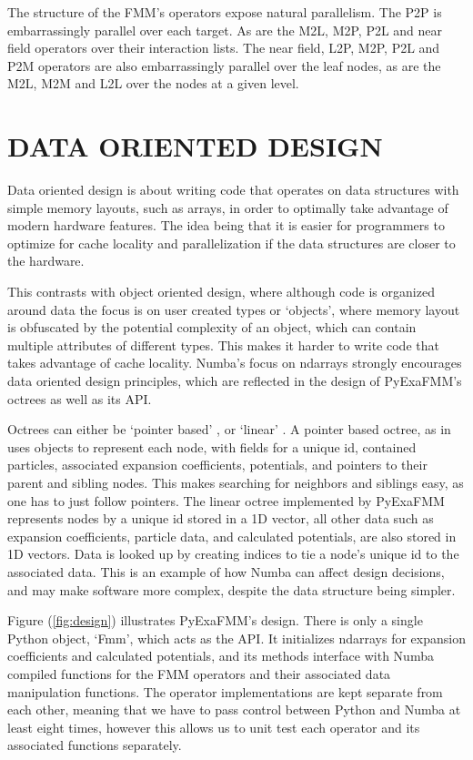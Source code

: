 \documentclass{IEEEcsmag}
\begin{document}
The structure of the FMM's operators expose natural parallelism. The P2P is embarrassingly parallel over each target. As are the M2L, M2P, P2L and near field operators over their interaction lists. The near field, L2P, M2P, P2L and P2M operators are also embarrassingly parallel over the leaf nodes, as are the M2L, M2M and L2L over the nodes at a given level.

\section{DATA ORIENTED DESIGN}

Data oriented design is about writing code that operates on data structures with simple memory layouts, such as arrays, in order to optimally take advantage of modern hardware features. The idea being that it is easier for programmers to optimize for cache locality and parallelization if the data structures are closer to the hardware. 

This contrasts with object oriented design, where although code is organized around data the focus is on user created types or `objects', where memory layout is obfuscated by the potential complexity of an object, which can contain multiple attributes of different types. This makes it harder to write code that takes advantage of cache locality. Numba's focus on ndarrays strongly encourages data oriented design principles, which are reflected in the design of PyExaFMM's octrees as well as its API.

Octrees can either be `pointer based' \cite{Wang2021}, or `linear' \cite{Sundar2007}. A pointer based octree, as in uses objects to represent each node, with fields for a unique id, contained particles, associated expansion coefficients, potentials, and pointers to their parent and sibling nodes. This makes searching for neighbors and siblings easy, as one has to just follow pointers. The linear octree implemented by PyExaFMM represents nodes by a unique id stored in a 1D vector, all other data such as expansion coefficients, particle data, and calculated potentials, are also stored in 1D vectors. Data is looked up by creating indices to tie a node's unique id to the associated data. This is an example of how Numba can affect design decisions, and may make software more complex, despite the data structure being simpler.

Figure (\ref{fig:design}) illustrates PyExaFMM's design. There is only a single Python object, `Fmm', which acts as the API. It initializes ndarrays for expansion coefficients and calculated potentials, and its methods interface with Numba compiled functions for the FMM operators and their associated data manipulation functions. The operator implementations are kept separate from each other, meaning that we have to pass control between Python and Numba at least eight times, however this allows us to unit test each operator and its associated functions separately.
\end{document}
